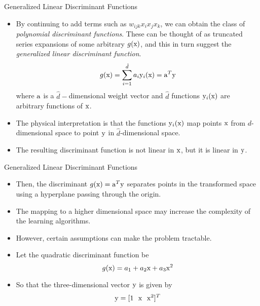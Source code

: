 \begin{frame}{Generalized Linear Discriminant Functions}
\begin{itemize}
\item By continuing to add terms such as $w_{ijk}x_ix_jx_k$, we can obtain the class of \textit{\color{mycolor2}polynomial discriminant functions}.
These can be thought of as truncated series expansions of some arbitrary $g ( {\rm x} )$, and this in turn suggest the
\textit{\color{mycolor2}generalized linear discriminant function}.
\begin{equation}
g({\rm x}) = \sum\limits_{i = 1}^{\hat d} {{a_i}{{\rm y}_i}({\rm x}) = {{\rm a}^T}{\rm y}} \nonumber
\end{equation}
where ${\rm a}$ is a $\hat{d}-$dimensional weight vector and $\hat{d}$ functions ${\rm y}_i({\rm x})$ are arbitrary functions of ${\rm x}$.
\item The physical interpretation is that the functions ${\rm y}_i({\rm x})$ map points ${\rm x}$ from $d$-dimensional space to point ${\rm y}$ in $\hat{d}$-dimensional space.
\item The resulting discriminant function is not linear in ${\rm x}$, but it is linear in ${\rm y}$.
\end{itemize}
\end{frame}

\begin{frame}{Generalized Linear Discriminant Functions}
\begin{itemize}
\item Then, the discriminant $g({\rm x}) = {\rm a}^T {\rm y}$ separates points in the transformed space using a hyperplane passing through the origin.
\item The mapping to a higher dimensional space may increase the complexity of the learning algorithms.
\item However, certain assumptions can make the problem tractable.
\item Let the quadratic discriminant function be
\begin{equation}
g({\rm x})=a_1+a_2{\rm x}+a_3{\rm x}^2 \nonumber
\end{equation}
\item So that the three-dimensional vector ${\rm y}$ is given by
\begin{equation}
{\rm y}=[1~~{\rm x}~~{\rm x}^2]^T \nonumber
\end{equation}
\end{itemize}
\end{frame}

